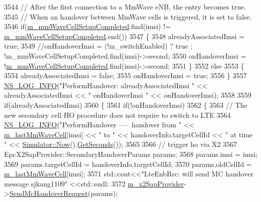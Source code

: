\begin{DoxyCode}
3544   \textcolor{comment}{// After the first connection to a MmWave eNB, the entry becomes true.}
3545   \textcolor{comment}{// When an handover between MmWave cells is triggered, it is set to false.}
3546   \textcolor{keywordflow}{if}(\hyperlink{classns3_1_1LteEnbRrc_ad19d6f4c123115e1d13e34609781ab20}{m\_mmWaveCellSetupCompleted}.find(imsi) != 
      \hyperlink{classns3_1_1LteEnbRrc_ad19d6f4c123115e1d13e34609781ab20}{m\_mmWaveCellSetupCompleted}.end())
3547   \{
3548     alreadyAssociatedImsi = \textcolor{keyword}{true};
3549     \textcolor{comment}{//onHandoverImsi = (!m\_switchEnabled) ? true : !m\_mmWaveCellSetupCompleted.find(imsi)->second;}
3550     onHandoverImsi = !\hyperlink{classns3_1_1LteEnbRrc_ad19d6f4c123115e1d13e34609781ab20}{m\_mmWaveCellSetupCompleted}.find(imsi)->second;
3551   \}
3552   \textcolor{keywordflow}{else}
3553   \{
3554     alreadyAssociatedImsi = \textcolor{keyword}{false};
3555     onHandoverImsi = \textcolor{keyword}{true};
3556   \}
3557   \hyperlink{group__logging_gafbd73ee2cf9f26b319f49086d8e860fb}{NS\_LOG\_INFO}(\textcolor{stringliteral}{"PerformHandover: alreadyAssociatedImsi "} << alreadyAssociatedImsi << \textcolor{stringliteral}{"
       onHandoverImsi "} << onHandoverImsi);
3558 
3559   \textcolor{keywordflow}{if}(alreadyAssociatedImsi)
3560   \{
3561     \textcolor{keywordflow}{if}(!onHandoverImsi)
3562     \{
3563       \textcolor{comment}{// The new secondary cell HO procedure does not require to switch to LTE}
3564       \hyperlink{group__logging_gafbd73ee2cf9f26b319f49086d8e860fb}{NS\_LOG\_INFO}(\textcolor{stringliteral}{"PerformHandover ----- handover from "} << 
      \hyperlink{classns3_1_1LteEnbRrc_a0d7b04f0383b0dc3f6a7360b87cbaeee}{m\_lastMmWaveCell}[imsi] << \textcolor{stringliteral}{" to "} << handoverInfo.targetCellId << \textcolor{stringliteral}{" at time "} << 
      \hyperlink{classns3_1_1Simulator_ac3178fa975b419f7875e7105be122800}{Simulator::Now}().\hyperlink{classns3_1_1Time_a8f20d5c3b0902d7b4320982f340b57c8}{GetSeconds}());
3565 
3566       \textcolor{comment}{// trigger ho via X2}
3567       EpcX2SapProvider::SecondaryHandoverParams params;
3568       params.imsi = imsi;
3569       params.targetCellId = handoverInfo.targetCellId;
3570       params.oldCellId = \hyperlink{classns3_1_1LteEnbRrc_a0d7b04f0383b0dc3f6a7360b87cbaeee}{m\_lastMmWaveCell}[imsi];
3571       std::cout<<\textcolor{stringliteral}{"LteEnbRrc: will send MC handover message sjkang1109"} <<std::endl;
3572       \hyperlink{classns3_1_1LteEnbRrc_ae8dc75f4f6f63b7736d86204a4beb415}{m\_x2SapProvider}->\hyperlink{classns3_1_1EpcX2SapProvider_a419d10f3f7f1808938a53439bed4f9eb}{SendMcHandoverRequest}(params);

\end{DoxyCode}

